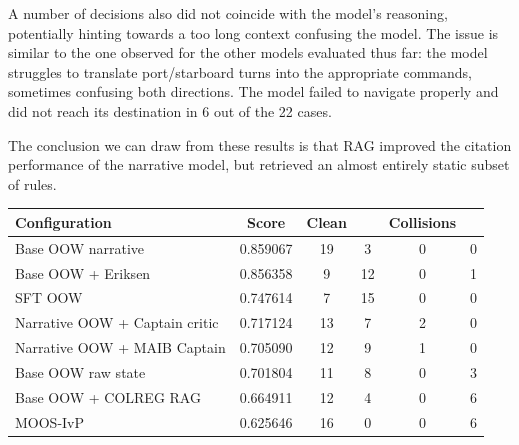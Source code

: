 \documentclass[10pt]{reportMaster}
\begin{document}
A number of decisions also did not coincide with the model's reasoning, potentially hinting towards a too long context confusing the model. The issue is similar to the one observed for the other models evaluated thus far: the model struggles to translate port/starboard turns into the appropriate commands, sometimes confusing both directions. The model failed to navigate properly and did not reach its destination in 6 out of the 22 cases.

The conclusion we can draw from these results is that RAG improved the citation performance of the narrative model, but retrieved an almost entirely static subset of rules. 





\begin{table}[t]
\centering
\label{tab:imazu-aggregate-results}
\begin{threeparttable}

\small
\setlength{\tabcolsep}{4pt}
\begin{tabular}{
p{5.0cm}
S[table-format=1.6]
S[table-format=2.0]
S[table-format=2.0]
S[table-format=1.0]
S[table-format=1.0]
}
\toprule
\textbf{Configuration}
& {\textbf{Score}}
& {\textbf{Clean}}
& {}
& {\textbf{Collisions}}
& {} \\
\midrule

Base OOW narrative
& 0.859067 & 19 & 3 & 0 & 0 \\

Base OOW + Eriksen
& 0.856358 & 9 & 12 & 0 & 1 \\

SFT OOW
& 0.747614 & 7 & 15 & 0 & 0 \\

Narrative OOW + Captain critic
& 0.717124 & 13 & 7 & 2 & 0 \\

Narrative OOW + MAIB Captain
& 0.705090 & 12 & 9 & 1 & 0 \\

Base OOW raw state
& 0.701804 & 11 & 8 & 0 & 3 \\

Base OOW + COLREG RAG
& 0.664911 & 12 & 4 & 0 & 6 \\

MOOS-IvP
& 0.625646 & 16 & 0 & 0 & 6 \\


\end{tabular}
\end{threeparttable}
\end{table}
\end{document}

